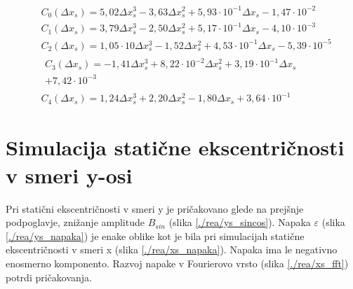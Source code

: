 \begin{eqnarray}
\label{real_xs_C0}
&C_0(\Delta x_s) =5,02\Delta x_s^{3}-3,63\Delta x_s^{2}+5,93\cdot 10^{-1}\Delta x_s-1,47\cdot 10^{-2} \\              
&C_1(\Delta x_s) =3,79\Delta x_s^{3}-2,50\Delta x_s^{2}+5,17\cdot 10^{-1}\Delta x_s-4,10\cdot 10^{-3} \\              
&C_2(\Delta x_s) =1,05\cdot 10\Delta x_s^{3}-1,52\Delta x_s^{2}+4,53\cdot 10^{-1}\Delta x_s-5,39\cdot 10^{-5} \\      
&\begin{split}C_3(\Delta x_s) =-1,41\Delta x_s^{3}+8,22\cdot 10^{-2}\Delta x_s^{2}+3,19\cdot 10^{-1}\Delta x_s\\+7,42\cdot 10^{-3} \end{split}\\
\label{real_xs_C4}
&C_4(\Delta x_s) =1,24\Delta x_s^{3}+2,20\Delta x_s^{2}-1,80\Delta x_s+3,64\cdot 10^{-1} 
\end{eqnarray}

\section{Simulacija statične ekscentričnosti v smeri y-osi}
Pri statični ekscentričnosti v smeri y je pričakovano glede na prejšnje podpoglavje, znižanje amplitude $B_{sin}$ (slika \ref{./rea/ys_sincos}).  Napaka $\varepsilon$ (slika \ref{./rea/ys_napaka}) je enake oblike kot je bila pri simulacijah statične ekscentričnosti v smeri x (slika \ref{./rea/xs_napaka}). Napaka ima le negativno enosmerno komponento. Razvoj napake v Fourierovo vrsto (slika \ref{./rea/xs_fft}) potrdi pričakovanja.
\newpage

